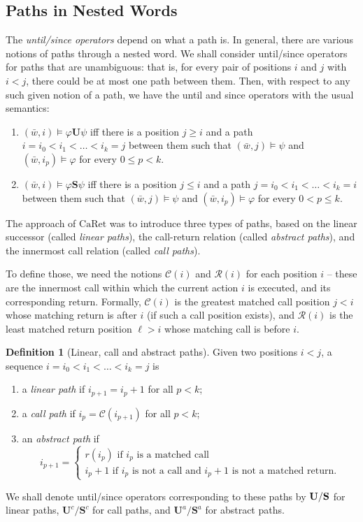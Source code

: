 \documentclass{LMCS}
\newcommand{\w}{{\bar{w}}}
\newcommand{\C}{{\mathcal{C}}}
\newcommand{\R}{{\mathcal{R}}}
\newcommand{\U}{{\mathbf U}}
\renewcommand{\S}{{\mathbf S}}
\renewcommand{\l}{\ell}
\renewcommand{\phi}{\varphi}
\theoremstyle{plain}
\theoremstyle{definition}
\newtheorem{definition}{Definition}[section]
\newcommand{\Sl}{\S}
\newcommand{\Uc}{\U^c}
\newcommand{\Sc}{\S^c}
\newcommand{\Ur}{\U^a}
\newcommand{\Sr}{\S^a}
\newcommand{\caret}{\text{CaRet}}
\begin{document}
\subsection{Paths in Nested Words}

The {\em until/since operators} depend on what a path is.
In general, there are various notions of paths through a nested word.
We shall consider until/since operators for paths that are unambiguous: that is, for
every pair of positions $i$ and $j$ with $i < j$, there could be at
most one path between them. 
Then, with respect to any such given notion of a path, we
have the until and since operators with the usual semantics:
\begin{enumerate}[$\bullet$]
\item $(\w,i)\models\phi\U\psi$ iff there is a position $j\geq
  i$ and a path $i=i_0 < i_1 < \ldots < i_k=j$ between them such that
  $(\w,j)\models\psi$ and $(\w,i_p)\models\phi$ for every $0\leq
  p < k$.
\item $(\w,i)\models\phi\S\psi$ iff there is a position $j\leq
  i$ and a path $j=i_0 < i_1 < \ldots < i_k=i$ between them such that
  $(\w,j)\models\psi$ and $(\w,i_p)\models\phi$ for every $0<
  p \leq k$.
\end{enumerate}

The approach of $\caret$ was to introduce three types of paths, based on
the linear successor (called {\em linear paths}), the call-return
relation (called {\em abstract paths}), and  the innermost
call relation (called {\em call paths}).

To define those, 
we need the notions $\C(i)$ and $\R(i)$ for each position $i$
-- these are the innermost call within which the current action $i$ is
executed, and its corresponding return. 
Formally, $\C(i)$ is the greatest
matched call position $j < i$ whose 
matching return is after $i$ (if such
a call position exists), and $\R(i)$ is the least matched 
return position $\l > i$ whose matching call is before $i$.



\begin{definition}[Linear, call and abstract paths]
Given two
 positions $i < j$, a sequence $i=i_0 < i_1 < \ldots < i_k=j$
is 
\begin{enumerate}[$\bullet$]
\item a {\em linear path} if $i_{p+1}=i_p + 1$ for all $p< k$;
\item a {\em call path} if $i_p=\C(i_{p+1})$ for all $p < k$;
\item an {\em abstract path} if $$i_{p+1}=\begin{cases} 
r(i_p)\text{ if }i_p\text{ is a matched call}\\
i_p+1 \text{ if }i_p \text{ is not a call and } i_p+1 \text{ is not a
  matched return.}
\end{cases}$$
\end{enumerate}
We shall denote until/since operators corresponding to these paths by 
$\Ul/\Sl$ for linear paths, $\Uc/\Sc$ for call paths, and $\Ur/\Sr$
for abstract paths.
\end{definition}
\end{document}
